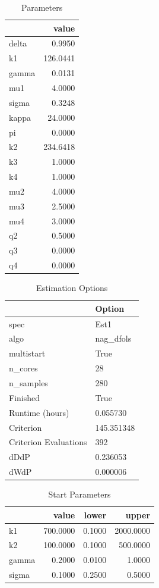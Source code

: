 \documentclass[letter, 10pt]{article}
\begin{document}
\begin{table}[h]
\centering
\caption{Parameters}
\begin{tabular}{lr}
\toprule
 & value \\
\midrule
delta & 0.9950 \\
k1 & 126.0441 \\
gamma & 0.0131 \\
mu1 & 4.0000 \\
sigma & 0.3248 \\
kappa & 24.0000 \\
pi & 0.0000 \\
k2 & 234.6418 \\
k3 & 1.0000 \\
k4 & 1.0000 \\
mu2 & 4.0000 \\
mu3 & 2.5000 \\
mu4 & 3.0000 \\
q2 & 0.5000 \\
q3 & 0.0000 \\
q4 & 0.0000 \\
\bottomrule
\end{tabular}
\end{table}

\begin{table}[h]
\centering
\caption{Estimation Options}
\begin{tabular}{ll}
\toprule
 & Option \\
\midrule
spec & Est1 \\
algo & nag\_dfols \\
multistart & True \\
n\_cores & 28 \\
n\_samples & 280 \\
Finished & True \\
Runtime (hours) & 0.055730 \\
Criterion & 145.351348 \\
Criterion Evaluations & 392 \\
dDdP & 0.236053 \\
dWdP & 0.000006 \\
\bottomrule
\end{tabular}
\end{table}

\begin{table}[h]
\centering
\caption{Start Parameters}
\begin{tabular}{lrrr}
\toprule
 & value & lower & upper \\
\midrule
k1 & 700.0000 & 0.1000 & 2000.0000 \\
k2 & 100.0000 & 0.1000 & 500.0000 \\
gamma & 0.2000 & 0.0100 & 1.0000 \\
sigma & 0.1000 & 0.2500 & 0.5000 \\
\bottomrule
\end{tabular}
\end{table}
\end{document}
